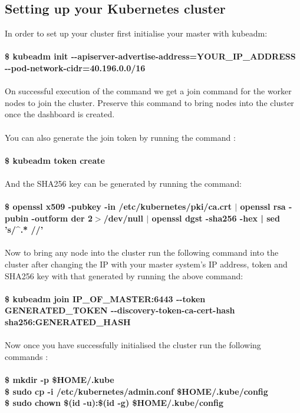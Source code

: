 \documentclass[12pt]{article}
\begin{document}
\subsection{Setting up your Kubernetes cluster}
In order to set up your cluster first initialise your master with kubeadm:\\\\
\textbf{\$ kubeadm init  -{}-apiserver-advertise-address=YOUR\_IP\_ADDRESS    -{}-pod-network-cidr=40.196.0.0/16}\\\\
On successful execution of the command we get a join command for the worker nodes to join the cluster. Preserve this command to bring nodes into the cluster once the dashboard is created.\\\\
 You can also generate the join token by running the command :\\\\
 \textbf{\$ kubeadm token create}\\\\
 And the SHA256 key can be generated by running the command:\\\\
 \textbf{\$ openssl x509 -pubkey -in /etc/kubernetes/pki/ca.crt $|$ openssl rsa -pubin -outform der 2$>$/dev/null $|$ openssl dgst -sha256 -hex | sed 's/\string^.* //'}\\\\
 Now to bring any node into the cluster run the following command into the cluster after changing the IP with your master system’s IP address, token and SHA256 key with that generated by running the above command:\\\\
 \textbf{\$ kubeadm join IP\_OF\_MASTER:6443 -{}-token GENERATED\_TOKEN -{}-discovery-token-ca-cert-hash sha256:GENERATED\_HASH}\\\\
 Now once you have successfully initialised the cluster run the following commands :\\\\
 \textbf{
 \$ mkdir -p \$HOME/.kube\\
 \$ sudo cp -i /etc/kubernetes/admin.conf \$HOME/.kube/config\\
 \$ sudo chown \$(id -u):\$(id -g) \$HOME/.kube/config
}
\end{document}
